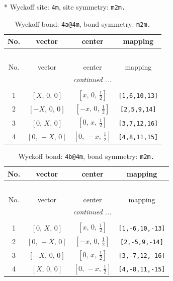 \documentclass[fleqn,8pt]{jsarticle}
\begin{document}
* Wyckoff site: {\tt 4m}, site symmetry: {\tt m2m.}
\renewcommand{\arraystretch}{1.2}
\begin{longtable}{cccc}
\caption{Wyckoff bond: {\tt 4a@4m}, bond symmetry: {\tt m2m.}}
 \\
 \hline \hline
No. & vector & center & mapping \\ \hline \endfirsthead

\multicolumn{3}{l}{\tablename\ \thetable{}} \\
 \hline \hline
No. & vector & center & mapping \\ \hline \endhead

 \hline \hline
\multicolumn{3}{r}{\footnotesize\it continued ...} \\ \endfoot

 \hline \hline
\multicolumn{3}{r}{} \\ \endlastfoot

1 & $\left[ X,\, 0,\, 0 \right]$ & $\left[ x,\, 0,\, \frac{1}{2} \right]$ & {\tt [1,6,10,13]} \\ \hline
2 & $\left[ - X,\, 0,\, 0 \right]$ & $\left[ - x,\, 0,\, \frac{1}{2} \right]$ & {\tt [2,5,9,14]} \\ \hline
3 & $\left[ 0,\, X,\, 0 \right]$ & $\left[ 0,\, x,\, \frac{1}{2} \right]$ & {\tt [3,7,12,16]} \\ \hline
4 & $\left[ 0,\, - X,\, 0 \right]$ & $\left[ 0,\, - x,\, \frac{1}{2} \right]$ & {\tt [4,8,11,15]} \\
\end{longtable}
\renewcommand{\arraystretch}{1.2}
\begin{longtable}{cccc}
\caption{Wyckoff bond: {\tt 4b@4m}, bond symmetry: {\tt m2m.}}
 \\
 \hline \hline
No. & vector & center & mapping \\ \hline \endfirsthead

\multicolumn{3}{l}{\tablename\ \thetable{}} \\
 \hline \hline
No. & vector & center & mapping \\ \hline \endhead

 \hline \hline
\multicolumn{3}{r}{\footnotesize\it continued ...} \\ \endfoot

 \hline \hline
\multicolumn{3}{r}{} \\ \endlastfoot

1 & $\left[ 0,\, X,\, 0 \right]$ & $\left[ x,\, 0,\, \frac{1}{2} \right]$ & {\tt [1,-6,10,-13]} \\ \hline
2 & $\left[ 0,\, - X,\, 0 \right]$ & $\left[ - x,\, 0,\, \frac{1}{2} \right]$ & {\tt [2,-5,9,-14]} \\ \hline
3 & $\left[ - X,\, 0,\, 0 \right]$ & $\left[ 0,\, x,\, \frac{1}{2} \right]$ & {\tt [3,-7,12,-16]} \\ \hline
4 & $\left[ X,\, 0,\, 0 \right]$ & $\left[ 0,\, - x,\, \frac{1}{2} \right]$ & {\tt [4,-8,11,-15]} \\
\end{longtable}
\end{document}
